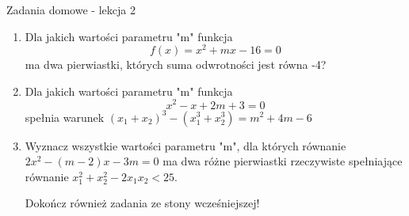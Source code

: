 \documentclass[12pt,a4paper]{article}
\begin{document}
	\newpage
	
	\begin{center}
		\LARGE Zadania domowe - lekcja 2
	\end{center}
	\vspace{1.5cm}
	
	\begin{enumerate}[1.]

	\item Dla jakich wartości parametru "m" funkcja
	$$f(x)=x^2+mx-16=0$$
	ma dwa pierwiastki, których suma odwrotności jest równa -4?
	
	\item Dla jakich wartości parametru "m" funkcja
	$$x^2-x+2m+3=0$$
	spełnia warunek $(x_1+x_2)^3-(x_1^3+x_2^3)=m^2+4m-6$
	
	\item Wyznacz wszystkie wartości parametru "m", dla których równanie $2x^2-(m-2)x-3m=0$ ma dwa różne pierwiastki rzeczywiste spełniające równanie $x_1^2+x_2^2-2x_1x_2<25$.
	
	\vspace{2cm}
	\Large Dokończ również zadania ze stony wcześniejszej!
	\end{enumerate}
	
	
	
\end{document}

